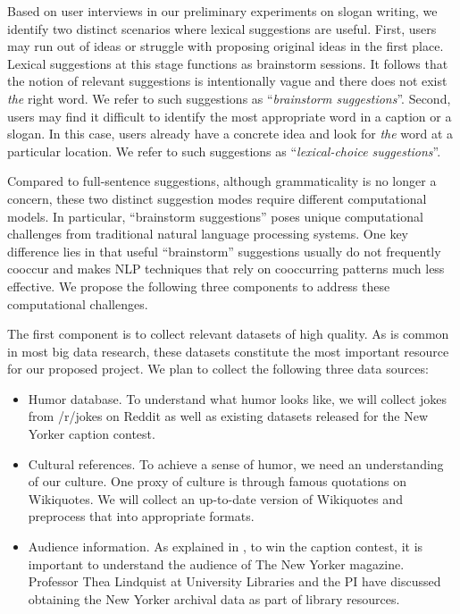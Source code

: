 Based on user interviews in our preliminary experiments on slogan writing, we identify two distinct scenarios where lexical suggestions are useful.
First, users may run out of ideas or struggle with proposing original ideas in the first place.
Lexical suggestions at this stage functions as brainstorm sessions.
It follows that the notion of relevant suggestions is intentionally vague and there does not exist {\em the} right word.
We refer to such suggestions as ``{\em brainstorm suggestions}''.
Second, users may find it difficult to identify the most appropriate word in a caption or a slogan.
In this case, users already have a concrete idea and look for {\em the} word at a particular location.
We refer to such suggestions as ``{\em lexical-choice suggestions}''.

Compared to full-sentence suggestions, although grammaticality is no longer a concern, these two distinct suggestion modes require different computational models.
In particular, ``brainstorm suggestions'' poses unique computational challenges from traditional natural language processing systems.
One key difference lies in that useful ``brainstorm'' suggestions usually do not frequently cooccur and makes NLP techniques that rely on cooccurring patterns much less effective.
We propose the following three components to address these computational challenges.

The first component is to collect relevant datasets of high quality.
As is common in most big data research,
these datasets constitute the most important resource for our proposed project.
We plan to collect the following three data sources:
\begin{itemize}[leftmargin=*,noitemsep,topsep=0pt,parsep=0pt,partopsep=0pt]
  \item Humor database. To understand what humor looks like, we will collect jokes from /r/jokes on Reddit as well as existing datasets released for the New Yorker caption contest.
  \item Cultural references. To achieve a sense of humor, we need an understanding of our culture. One proxy of culture is through famous quotations on Wikiquotes. We will collect an up-to-date version of Wikiquotes and preprocess that into appropriate formats.
  \item Audience information. As explained in \citet{house_slate}, to win the caption contest, it is important to understand the audience of The New Yorker magazine. Professor Thea Lindquist at University Libraries and the PI have discussed obtaining the New Yorker archival data as part of library resources.
\end{itemize}




